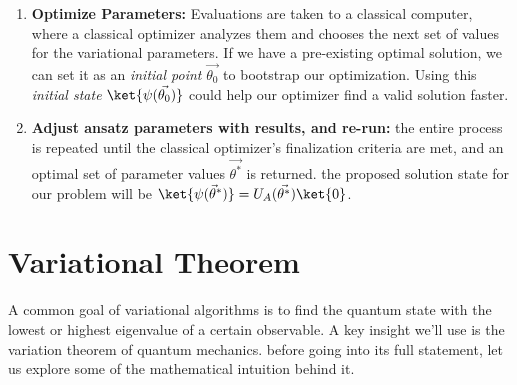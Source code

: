 \documentclass[12pt, oneside]{book}
\theoremstyle{definition}
\theoremstyle{definition}
\theoremstyle{remark}
\begin{document}
\begin{enumerate}
    \item \textbf{Optimize Parameters: }Evaluations are taken to a classical computer, where a classical optimizer analyzes them and chooses the next set of values for the variational parameters. If we have a pre-existing optimal solution, we can set it as an \textit{initial point} $\vec{\theta_0}$ to bootstrap our optimization. Using this \textit{initial state} $\ket{\psi(\vec{\theta_0})}$ could help our optimizer find a valid solution faster.
    \item \textbf{Adjust ansatz parameters with results, and re-run: }the entire process is repeated until the classical optimizer's finalization criteria are met, and an optimal set of parameter values $\vec{\theta^*}$ is returned. the proposed solution state for our problem will be $\ket{\psi(\vec{\theta}^*)}=U_A(\vec{\theta^*})\ket{0}$.
\end{enumerate}

\section{Variational Theorem}
A common goal of variational algorithms is to find the quantum state with the lowest or highest eigenvalue of a certain observable. A key insight we'll use is the variation theorem of quantum mechanics. before going into its full statement, let us explore some of the mathematical intuition behind it.
\end{document}
